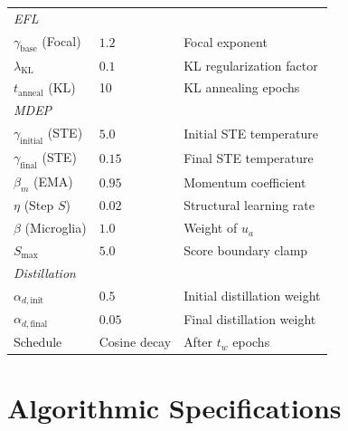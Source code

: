 \documentclass[11pt]{article}
\begin{document}
\begin{table}[H]
\begin{tabular}{@{}lll@{}}
\midrule
\multicolumn{3}{l}{\emph{EFL}} \\
$\gamma_{\text{base}}$ (Focal) & $1.2$ & Focal exponent \\
$\lambda_{\text{KL}}$ & $0.1$ & KL regularization factor \\
$t_{\text{anneal}}$ (KL) & 10 & KL annealing epochs \\
\midrule
\multicolumn{3}{l}{\emph{MDEP}} \\
$\gamma_{\text{initial}}$ (STE) & $5.0$ & Initial STE temperature \\
$\gamma_{\text{final}}$ (STE) & $0.15$ & Final STE temperature \\
$\beta_m$ (EMA) & $0.95$ & Momentum coefficient \\
$\eta$ (Step $S$) & $0.02$ & Structural learning rate \\
$\beta$ (Microglia) & $1.0$ & Weight of $u_a$ \\
$S_{\max}$ & $5.0$ & Score boundary clamp \\
\midrule
\multicolumn{3}{l}{\emph{Distillation}} \\
$\alpha_{d,\text{init}}$ & $0.5$ & Initial distillation weight \\
$\alpha_{d,\text{final}}$ & $0.05$ & Final distillation weight \\
Schedule & Cosine decay & After $t_w$ epochs \\
\bottomrule
\end{tabular}
\end{table}

\section{Algorithmic Specifications}\label{sec:algorithm}
\end{document}
